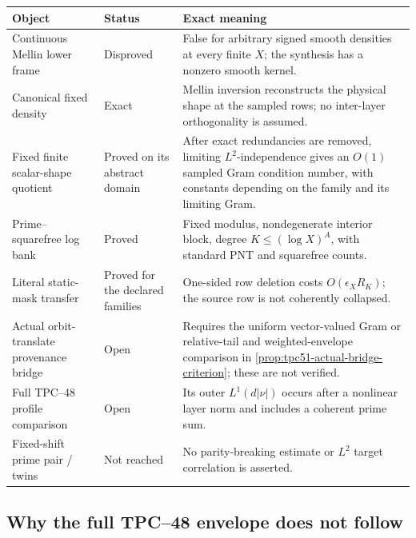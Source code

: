 \begin{center}
\small
\begin{tabular}{>{\raggedright\arraybackslash}p{}
                >{\raggedright\arraybackslash}p{}
                >{\raggedright\arraybackslash}p{}}
\toprule
Object & Status & Exact meaning \\
\midrule
Continuous Mellin lower frame
& Disproved
& False for arbitrary signed smooth densities at every finite \(X\);
  the synthesis has a nonzero smooth kernel. \\
Canonical fixed density
& Exact
& Mellin inversion reconstructs the physical shape at the sampled
  rows; no inter-layer orthogonality is assumed. \\
Fixed finite scalar-shape quotient
& Proved on its abstract domain
& After exact redundancies are removed, limiting \(L^2\)-independence
  gives an \(O(1)\) sampled Gram condition number, with constants
  depending on the family and its limiting Gram. \\
Prime--squarefree log bank
& Proved
& Fixed modulus, nondegenerate interior block, degree
  \(K\leq(\log X)^A\), with standard PNT and squarefree counts. \\
Literal static-mask transfer
& Proved for the declared families
& One-sided row deletion costs \(O(\epsilon_XR_K)\); the source row is
  not coherently collapsed. \\
Actual orbit-translate provenance bridge
& Open
& Requires the uniform vector-valued Gram or relative-tail and
  weighted-envelope comparison in
  \cref{prop:tpc51-actual-bridge-criterion}; these are not verified. \\
Full TPC--48 profile comparison
& Open
& Its outer \(L^1(d|\nu|)\) occurs after a nonlinear layer norm and
  includes a coherent prime sum. \\
Fixed-shift prime pair / twins
& Not reached
& No parity-breaking estimate or \(L^2\) target correlation is asserted. \\
\bottomrule
\end{tabular}
\end{center}

\subsection{Why the full TPC--48 envelope does not follow}

